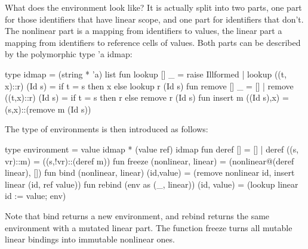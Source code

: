 \documentclass{llncs}
\begin{document}
What does the environment look like? It is actually split into two parts, one part for those identifiers that have linear scope, and one part for identifiers that don't. The nonlinear part is a mapping from identifiers to values, the linear part a mapping from identifiers to reference cells of values. Both parts can be described by the polymorphic type 'a idmap:
\begin{babellisting}
type idmap = (string * 'a) list
fun lookup [] _ = raise Illformed
  | lookup ((t, x)::r) (Id s) = 
      if t = s then x else lookup r (Id s)
fun remove [] _ = []
  | remove ((t,x)::r) (Id s) = 
      if t = s then r else remove r (Id s)
fun insert m ((Id s),x) = (s,x)::(remove m (Id s))
\end{babellisting}
The type of environments is then introduced as follows:
\begin{babellisting}
type environment = value idmap * (value ref) idmap
fun deref [] = [] | deref ((s, vr)::m) = ((s,!vr)::(deref m))
fun freeze (nonlinear, linear) = (nonlinear@(deref linear), [])
fun bind (nonlinear, linear) (id,value) =
  (remove nonlinear id, insert linear (id, ref value))
fun rebind (env as (_, linear)) (id, value) =
  (lookup linear id := value; env)
\end{babellisting}
Note that bind returns a new environment, and rebind returns the same environment with a mutated linear part. The function freeze
turns all mutable linear bindings into immutable nonlinear ones.
\end{document}
